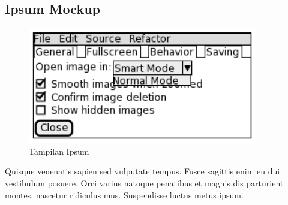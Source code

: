 \subsection{Ipsum Mockup}
\begin{figure}[H]
    \centering
    \includegraphics[width=10cm]{assets/pics/dummy-mockup2.png}
    \caption{Tampilan Ipsum}
    \label{fig:ipsumMockup}
\end{figure}

Quisque venenatis sapien sed vulputate tempus. Fusce sagittis enim eu dui vestibulum posuere. Orci varius natoque penatibus et magnis dis parturient montes, nascetur ridiculus mus. Suspendisse luctus metus ipsum.